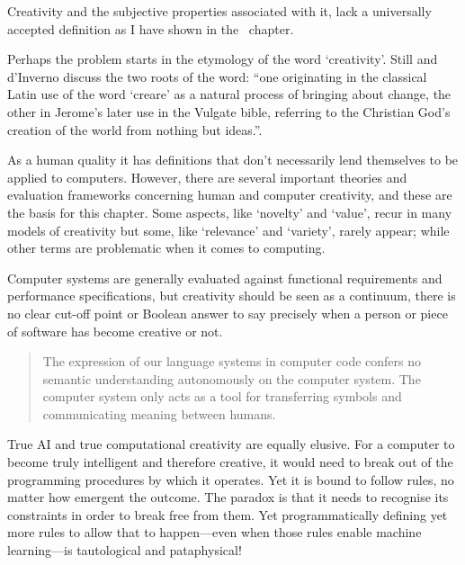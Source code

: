 Creativity and the subjective properties associated with it, lack a universally accepted definition as I have shown in the~ chapter. 

Perhaps the problem starts in the etymology of the word `creativity'. Still and d'Inverno discuss the two roots of the word: ``one originating in the classical Latin use of the word `creare' as a natural process of bringing about change, the other in Jerome's later use in the Vulgate bible, referring to the Christian God's creation of the world from nothing but ideas.''\autocite*{Still2016}.

As a human quality it has definitions that don't necessarily lend themselves to be applied to computers. However, there are several important theories and evaluation frameworks concerning human and computer creativity, and these are the basis for this chapter. Some aspects, like `novelty' and `value', recur in many models of creativity but some, like `relevance' and `variety', rarely appear; while other terms are problematic when it comes to computing. 

Computer systems are generally evaluated against functional requirements and performance specifications, but creativity should be seen as a continuum, there is no clear cut-off point or Boolean answer to say precisely when a person or piece of software has become creative or not.

\begin{quotation}
  The expression of our language systems in computer code confers no semantic understanding autonomously on the computer system. The computer system only acts as a tool for transferring symbols and communicating meaning between humans. 
\end{quotation}

True \ac{AI} and true computational creativity are equally elusive. For a computer to become truly intelligent and therefore creative, it would need to break out of the programming procedures by which it operates. Yet it is bound to follow rules, no matter how emergent the outcome. The paradox is that it needs to recognise its constraints in order to break free from them. Yet programmatically defining yet more rules to allow that to happen---even when those rules enable machine learning---is tautological and pataphysical!

